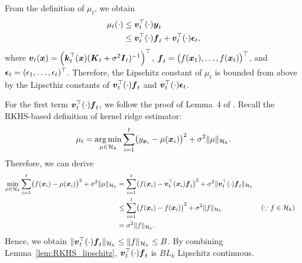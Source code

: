 
From the definition of $\mu_t$, we obtain
\begin{align*}
    \mu_t (\cdot)
    &\leq \boldsymbol{v}_t^\top (\cdot) \boldsymbol{y}_t  \\
    &\leq \boldsymbol{v}_t^\top (\cdot) \boldsymbol{f}_t  + \boldsymbol{v}_t^\top (\cdot) \boldsymbol{\epsilon}_t,
\end{align*}
where $\boldsymbol{v}_t (\boldsymbol{x}) = \left(\boldsymbol{k}_t^\top(\boldsymbol{x}) (\boldsymbol{K}_t + \sigma^2 \boldsymbol{I}_t)^{-1}\right)^\top$, $\boldsymbol{f}_t = \bigl(f(\boldsymbol{x}_1), \dots, f(\boldsymbol{x}_t) \bigr)^\top$, and $\boldsymbol{\epsilon}_t = (\epsilon_1, \dots, \epsilon_t)^\top$.
%
Therefore, the Lipschitz constant of $\mu_t$ is bounded from above by the Lipscthiz constants of $\boldsymbol{v}_t^\top (\cdot) \boldsymbol{f}_t$ and $\boldsymbol{v}_t^\top (\cdot) \boldsymbol{\epsilon}_t$.


For the first term $\boldsymbol{v}_t^\top (\cdot) \boldsymbol{f}_t$, we follow the proof of Lemma~4 of \citet{vakili2021-optimal}.
%
Recall the RKHS-based definition of kernel ridge estimator:
\begin{align*}
    \mu_t = \operatorname*{arg\,min}_{\mu \in {\cal H}_k} \sum_{i=1}^t \bigl( y_{\boldsymbol{x}_i} - \mu(\boldsymbol{x}_i) \bigr)^2 + \sigma^2 \| \mu \|_{{\cal H}_k}.
\end{align*}
%
Therefore, we can derive
\begin{align*}
    \min_{\mu \in {\cal H}_k} \sum_{i=1}^t \bigl( f(\boldsymbol{x}_i) - \mu(\boldsymbol{x}_i) \bigr)^2 + \sigma^2 \| \mu \|_{{\cal H}_k} 
    &= \sum_{i=1}^t \bigl( f(\boldsymbol{x}_i) - \boldsymbol{v}_t^\top (\boldsymbol{x}_i) \boldsymbol{f}_t \bigr)^2 + \sigma^2 \| \boldsymbol{v}_t^\top (\cdot) \boldsymbol{f}_t \|_{{\cal H}_k} \\
    &\leq \sum_{i=1}^t \bigl( f(\boldsymbol{x}_i) - f (\boldsymbol{x}_i) \bigr)^2 + \sigma^2 \| f \|_{{\cal H}_k} && \left(\because f \in {\cal H}_k \right) \\
    &= \sigma^2 \| f \|_{{\cal H}_k}.
\end{align*}
%
Hence, we obtain $\| \boldsymbol{v}_t^\top (\cdot) \boldsymbol{f}_t \|_{{\cal H}_k} \leq \| f \|_{{\cal H}_k} \leq B$.
%
By combining Lemma~\ref{lem:RKHS_lipschitz}, $\boldsymbol{v}_t^\top (\cdot) \boldsymbol{f}_t$ is $B L_k$ Lipschitz continuous.


